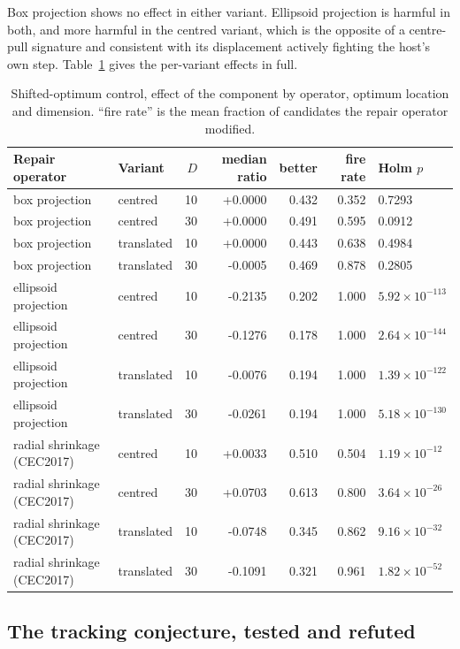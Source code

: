 \documentclass[11pt,a4paper]{article}
\begin{document}
Box projection shows no effect in either variant. Ellipsoid projection is harmful in
both, and more harmful in the centred variant, which is the opposite of a centre-pull
signature and consistent with its displacement actively fighting the host's own step.
Table~\ref{tab:variant} gives the per-variant effects in full.

\begin{table}[htbp]
\centering
\caption{Shifted-optimum control, effect of the component by operator, optimum location
and dimension. ``fire rate'' is the mean fraction of candidates the repair operator
modified.}
\label{tab:variant}
\small
\begin{tabular}{llrrrrl}
\toprule
Repair operator & Variant & $D$ & median ratio & better & fire rate & Holm $p$ \\
\midrule
box projection & centred & 10 & +0.0000 & 0.432 & 0.352 & 0.7293 \\
box projection & centred & 30 & +0.0000 & 0.491 & 0.595 & 0.0912 \\
box projection & translated & 10 & +0.0000 & 0.443 & 0.638 & 0.4984 \\
box projection & translated & 30 & -0.0005 & 0.469 & 0.878 & 0.2805 \\
ellipsoid projection & centred & 10 & -0.2135 & 0.202 & 1.000 & $5.92\times10^{-113}$ \\
ellipsoid projection & centred & 30 & -0.1276 & 0.178 & 1.000 & $2.64\times10^{-144}$ \\
ellipsoid projection & translated & 10 & -0.0076 & 0.194 & 1.000 & $1.39\times10^{-122}$ \\
ellipsoid projection & translated & 30 & -0.0261 & 0.194 & 1.000 & $5.18\times10^{-130}$ \\
radial shrinkage (CEC2017) & centred & 10 & +0.0033 & 0.510 & 0.504 & $1.19\times10^{-12}$ \\
radial shrinkage (CEC2017) & centred & 30 & +0.0703 & 0.613 & 0.800 & $3.64\times10^{-26}$ \\
radial shrinkage (CEC2017) & translated & 10 & -0.0748 & 0.345 & 0.862 & $9.16\times10^{-32}$ \\
radial shrinkage (CEC2017) & translated & 30 & -0.1091 & 0.321 & 0.961 & $1.82\times10^{-52}$ \\
\bottomrule
\end{tabular}
\end{table}

\subsection{The tracking conjecture, tested and refuted}
\end{document}
